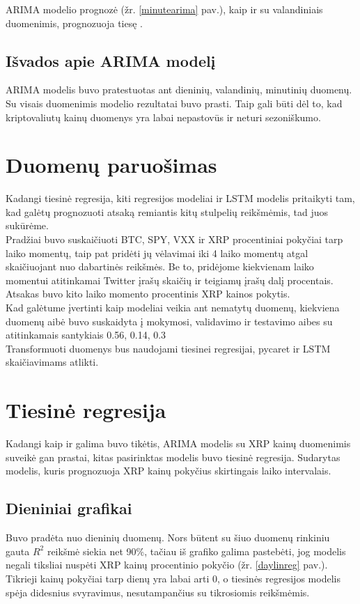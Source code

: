 \documentclass[12pt,a4paper]{article}
\begin{document}
ARIMA modelio prognozė (žr. \ref{minutearima} pav.), kaip ir su valandiniais duomenimis, prognozuoja tiesę .

\subsection{Išvados apie ARIMA modelį}
ARIMA modelis buvo pratestuotas ant dieninių, valandinių, minutinių duomenų. Su visais duomenimis modelio rezultatai buvo prasti. Taip gali būti dėl to, kad kriptovaliutų kainų duomenys yra labai nepastovūs ir neturi sezoniškumo.
\newpage
\clearpage

\section{Duomenų paruošimas}
Kadangi tiesinė regresija, kiti regresijos modeliai ir LSTM modelis pritaikyti tam, kad galėtų prognozuoti atsaką remiantis kitų stulpelių reikšmėmis, tad juos sukūrėme.\\
Pradžiai buvo suskaičiuoti BTC, SPY, VXX ir XRP procentiniai pokyčiai tarp laiko momentų, taip pat pridėti jų vėlavimai iki 4 laiko momentų atgal skaičiuojant nuo dabartinės reikšmės. Be to, pridėjome kiekvienam laiko momentui atitinkamai Twitter įrašų skaičių ir teigiamų įrašų dalį procentais. \\
Atsakas buvo kito laiko momento procentinis XRP kainos pokytis. \\
Kad galėtume įvertinti kaip modeliai veikia ant nematytų duomenų, kiekviena duomenų aibė buvo suskaidyta į mokymosi, validavimo ir testavimo aibes su atitinkamais santykiais 0.56, 0.14, 0.3 \\
Transformuoti duomenys bus naudojami tiesinei regresijai, pycaret ir LSTM skaičiavimams atlikti.
\newpage
\clearpage

\section{Tiesinė regresija}
Kadangi kaip ir galima buvo tikėtis, ARIMA modelis su XRP kainų duomenimis suveikė gan prastai, kitas pasirinktas modelis buvo tiesinė regresija. Sudarytas modelis, kuris prognozuoja XRP kainų pokyčius skirtingais laiko intervalais.

\subsection{Dieniniai grafikai}
Buvo pradėta nuo dieninių duomenų. Nors būtent su šiuo duomenų rinkiniu gauta $R^{2}$ reikšmė siekia net 90\%, tačiau iš grafiko galima pastebėti, jog modelis negali tiksliai nuspėti XRP kainų procentinio pokyčio (žr. \ref{daylinreg} pav.). Tikrieji kainų pokyčiai tarp dienų yra labai arti 0, o tiesinės regresijos modelis spėja didesnius svyravimus, nesutampančius su tikrosiomis reikšmėmis.
\end{document}

